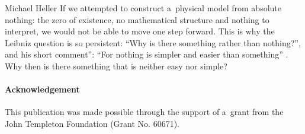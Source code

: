 \begin{artengenv}{Michael Heller}
If we attempted to construct a~physical model from absolute nothing: the zero of existence, no mathematical
structure and nothing to interpret, we would not be able to move one step forward. This is why the Leibniz question is
so persistent: ``Why is there something rather than nothing?'', and his short comment'': ``For nothing is simpler and
easier than something'' \parencite[p.~303]{leibniz_principles_1908}\label{ref:RNDdi2I3ZddDY}. Why then is there something that is neither
easy nor simple?

\paragraph{Acknowledgement} 
This publication was made possible through the support of a~grant from the John Templeton Foundation (Grant No. 60671).

\end{artengenv}
